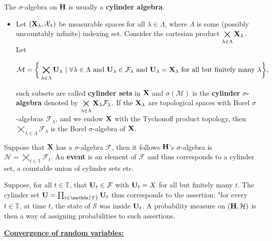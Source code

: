 \documentclass{homework}
\begin{document}
\begin{itemize}
    The $\sigma$-algebra on ${\bf H}$ is usually a \textbf{cylinder algebra}. 
    
    \begin{itemize}
        \item Let $({\bf X}_\lambda, \mathcal{X}_\lambda)$ be measurable spaces for all $\lambda \in \Lambda$, where $\Lambda$ is some (possibly uncountably infinite) indexing set. Consider the cartesian product  $\bigtimes\limits_{\lambda \in \Lambda}{\bf X}_\lambda$. Let 
        
        $$
        \mathcal{M} = \bigg\{\bigtimes\limits_{\lambda \in \Lambda}{\bf U}_\lambda \textnormal{ } | \textnormal{ } \forall \lambda \in \Lambda \textnormal{ and } {\bf U}_{\lambda} \in \mathcal{F}_{\lambda} \textnormal{ and } {\bf U}_{\lambda} = {\bf X}_{\lambda} \textnormal{ for all but finitely many } \lambda \bigg\},
        $$
        
    such subsets are called \textbf{cylinder sets} in ${\bf X}$ and $\sigma(\mathcal{M})$ is the \textbf{cylinder} $\sigma$\textbf{-algebra} denoted by $\bigtimes\limits_{\lambda \in \Lambda}{\bf X}_\lambda \mathcal{F}_{\lambda}$. If the ${\bf X}_{\lambda}$ are topological spaces with Borel $\sigma$-algebras $\mathcal{F}_{\lambda}$, and we endow ${\bf X}$ with the Tychonoff product topology, then $\bigtimes\limits_{\lambda \in \Lambda} \mathcal{F}_{\lambda}$ is the Borel $\sigma$-algebra of ${\bf X}$. \\
    \end{itemize}
    
    Suppose that ${\bf X}$ has a $\sigma$-algebra $\mathcal{F}$, then it follows ${\bf H}$'s $\sigma$-algebra is $\mathcal{H}= \bigtimes\limits_{t \in \mathds{T}}\mathcal{F}_t$. An \textbf{event} is an element of $\mathcal{F}$ and thus corresponds to a cylinder set, a countable union of cylinder sets etc.
    
    Suppose, for all ${t\in \mathds{T}}$, that ${\bf U}_t \in \mathcal{F}$ with ${\bf U}_t = X$ for all but finitely many $t$. The cylinder set ${\bf U} = \prod_{t \in \mathds{T}} {\bf U}_t$ thus corresponds to the assertion: "for every ${t\in \mathds{T}}$, at time $t$, the state of $\mathcal{S}$ was inside ${\bf U}_t$. A probability measure on $(\bf H, \mathcal{H})$ is then a way of assigning probabilities to such assertions. \\
\end{itemize}

\underline{\textbf{Convergence of random variables:}}
\end{document}
